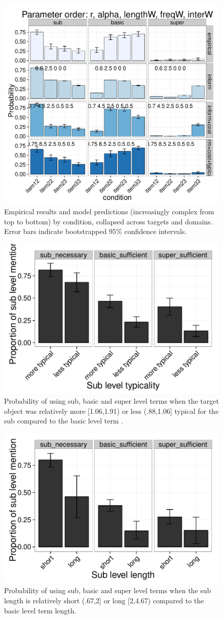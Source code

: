 \documentclass[10pt,letterpaper]{article}
\begin{document}
\begin{figure}[ht!]
\centering
\includegraphics[width=.5\textwidth]{graphs/collapsed-pattern}
\caption{Empirical results and model predictions (increasingly complex from top to bottom) by condition, collapsed across targets and domains. Error bars indicate bootstrapped 95\% confidence intervals.}
\label{fig:qualitativemodel}
\end{figure}

\begin{figure}[ht!]
\centering
\includegraphics[width=.5\textwidth]{graphs/typicality-effect}
\caption{Probability of using sub, basic and super level terms when the target object was relatively more [1.06,1.91) or less (.88,1.06] typical for the sub compared to the basic level term .}
 \label{fig:typicalityeffect}
\end{figure}


\begin{figure}[ht!]
\centering
\includegraphics[width=.5\textwidth]{graphs/length-effect}
\caption{Probability of using sub, basic and super level terms when the sub  length is relatively short (.67,2] or long [2,4.67) compared to the basic level term length.}
 \label{fig:lengtheffect}
\end{figure}
\end{document}
